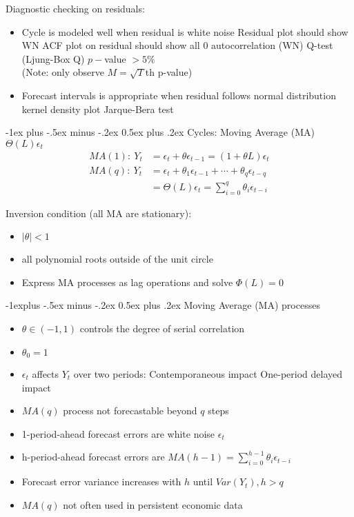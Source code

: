\documentclass[a4paper,12pt,landscape]{article}
\makeatletter
\renewcommand{\section}{\@startsection{section}{1}{0mm}%
                                {-1ex plus -.5ex minus -.2ex}%
                                {0.5ex plus .2ex}%
                                {\normalfont\large\bfseries\color{red}}}
\renewcommand{\subsection}{\@startsection{subsection}{2}{0mm}%
                                {-1explus -.5ex minus -.2ex}%
                                {0.5ex plus .2ex}%
                                {\normalfont\normalsize\bfseries\color{blue}}}
\makeatother
\begin{document}
\begin{multicols}{3}
Diagnostic checking on residuals:
\begin{itemize}
    \item Cycle is modeled well when residual is white noise
        \subitem[method1] Residual plot should show WN
        \subitem[method2] ACF plot on residual should show all 0 autocorrelation (WN)
        \subitem[method3] Q-test (Ljung-Box Q) $p-$value $> 5\%$\\
        (Note: only observe $M=\sqrt{T}$th p-value)
    \item Forecast intervals is appropriate when residual follows normal distribution
        \subitem[method1] kernel density plot
        \subitem[method2] Jarque-Bera test
\end{itemize}


\section{Cycles: Moving Average (MA) $\Theta(L)\epsilon_t$}
\begin{align*}
    MA(1) :~  Y_t &= \epsilon_t + \theta \epsilon_{t-1} = (1+\theta L)\epsilon_t\\
    MA(q) :~  Y_t &= \epsilon_t + \theta_1\epsilon_{t-1} + \cdots + \theta_q\epsilon_{t-q} \\
                  &=\Theta(L)\epsilon_t = \sum_{i=0}^q\theta_i\epsilon_{t-i}
\end{align*}

Inversion condition (all MA are stationary):
\begin{itemize}
    \item $|\theta| < 1$
    \item all polynomial roots outside of the unit circle
    \item Express MA processes as lag operations and solve $\Phi(L)=0$
\end{itemize}

\subsection{Moving Average (MA) processes}

\begin{itemize}
    \item $\theta \in (-1, 1)$ controls the degree of serial correlation
    \item $\theta_0 = 1$
    \item $\epsilon_t$ affects $Y_t$ over two periods:
        \subitem[1] Contemporaneous impact
        \subitem[2] One-period delayed impact
    \item $MA(q)$ process not forecastable beyond $q$ steps
    \item 1-period-ahead forecast errors are white noise $\epsilon_t$
    \item h-period-ahead forecast errors are $MA(h-1) = \sum_{i=0}^{h-1}\theta_i\epsilon_{t-i}$
    \item Forecast error variance increases with $h$ until $Var(Y_t), h>q$
    \item $MA(q)$ not often used in persistent economic data
\end{itemize}


\end{multicols}
\end{document}
